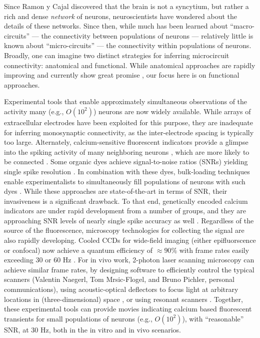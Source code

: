 Since Ramon y Cajal discovered that the brain is not a syncytium, but rather a rich and dense \emph{network} of neurons, neuroscientists have wondered about the details of these networks.  Since then, while much has been learned about ``macro-circuits''  --- the connectivity between populations of neurons --- relatively little is known about ``micro-circuits'' --- the connectivity within populations of neurons. Broadly, one can imagine two distinct strategies for inferring microcircuit connectivity: anatomical and functional.  While anatomical approaches are rapidly improving and currently show great promise \cite{Briggman2006, Brainbow07, LuLichtman09}, our focus here is on functional approaches.

Experimental tools that enable approximately simultaneous observations of the activity many (e.g., $O(10^2)$) neurons are now widely available.  While arrays of extracellular electrodes have been exploited for this purpose, they are inadequate for inferring monosynaptic connectivity, as the inter-electrode spacing is typically too large.  Alternately, calcium-sensitive fluorescent indicators provide a glimpse into the spiking activity of many neighboring neurons \cite{Tsien89}, which are more likely to be connected \cite{Abeles91, Braitenberg1998}. Some organic dyes achieve signal-to-noise ratios (SNRs) yielding single spike resolution \cite{ImagingManual}.  In combination with these dyes, bulk-loading techniques enable experimentalists to simultaneously fill populations of neurons with such dyes \cite{StosiekKonnerth03}.  While these approaches are state-of-the-art in terms of SNR, their invasiveness is a significant drawback.  To that end, genetically encoded calcium indicators are under rapid development from a number of groups, and they are approaching SNR levels of nearly single spike accuracy as well \cite{WallaceHasan08}. Regardless of the source of the fluorescence, microscopy technologies for collecting the signal are also rapidly developing.  Cooled CCDs for wide-field imaging (either epifluorscence or confocal) now achieve a quantum efficiency of $\approx 90 \%$ with frame rates easily exceeding $30$ or $60$ Hz \cite{Djurisic04}.  For in vivo work, 2-photon laser scanning microscopy can achieve similar frame rates, by designing software to efficiently control the typical scanners (Valentin Naegerl, Tom Mrsic-Flogel, and Bruno Pichler, personal communications), using acoustic-optical deflectors to focus light at arbitrary locations in (three-dimensional) space \cite{ReddySaggau05, Iyer06, SalomeBourdieu06, ReddySaggau08}, or using resonant scanners \cite{NguyenParker01}.  Together, these experimental tools can provide movies indicating calcium based fluorescent transients for small populations of neurons (e.g., $O(10^2)$), with ``reasonable'' SNR, at 30 Hz, both in the in vitro and in vivo scenarios.  

